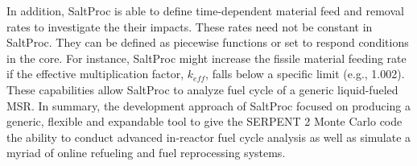 In addition, SaltProc is able to define time-dependent material feed and removal rates to investigate the their impacts. These rates need not be constant in SaltProc. They can be defined as piecewise functions or set to respond conditions in the core. For instance, SaltProc might increase the fissile material feeding rate if the effective multiplication factor, $k_{eff}$, falls below a specific limit (e.g., 1.002).
These capabilities allow SaltProc to analyze fuel cycle of a generic liquid-fueled \gls{MSR}. In summary, the development approach of SaltProc focused on producing a generic, flexible and expandable tool to give the SERPENT 2 Monte Carlo code the ability to conduct advanced in-reactor fuel cycle analysis as well as simulate a myriad of online refueling and fuel reprocessing systems.
